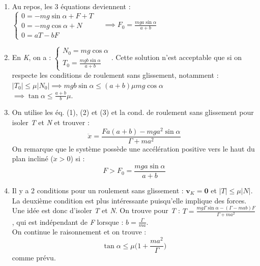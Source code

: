 \documentclass[a4paper]{article}
\begin{document}
\begin{enumerate}[(1)]

\item Au repos, les 3 équations deviennent : $\displaystyle \begin{cases}
0 = - m g \sin \alpha + F + T \\
0 = - m g \cos \alpha + N \\
0 = a T - b F
\end{cases} \quad \implies F_0 = \frac{m g a \sin \alpha}{a + b} $

\item En \emph{K}, on a : $\displaystyle \begin{cases}
N_0 = m g \cos \alpha \\
\displaystyle T_0 = \frac{m g b \sin \alpha}{a + b}
\end{cases} $. Cette solution n'est acceptable que si on respecte les conditions de roulement sans glissement, notamment : $ |T_0| \leq \mu |N_0| \implies m g b \sin \alpha \leq (a + b) \mu m g \cos \alpha $ \\
$\displaystyle \implies \tan \alpha \leq \frac{a + b}{b} \mu $.

\item On utilise les éq. (1), (2) et (3) et la cond. de roulement sans glissement pour isoler \emph{T} et \emph{N} et trouver : 
\[ \ddot{x} = \frac{F a (a + b) - m g a^2 \sin \alpha}{\Gamma + m a^2} \]
On remarque que le système possède une accélération positive vers le haut du plan incliné ($ \ddot{x} > 0 $) si : 
\[ F > F_0 = \frac{m g a \sin \alpha}{a + b} \]

\item Il y a 2 conditions pour un roulement sans glissement : $ \textbf{v}_K = \textbf{0} $ et $ |T| \leq \mu |N| $. La deuxième condition est plus intéressante puisqu'elle implique des forces. Une idée est donc d'isoler \emph{T} et \emph{N}. On trouve pour \emph{T} : $\displaystyle T = \frac{m g \Gamma \sin \alpha - (\Gamma - m a b) F}{\Gamma + m a^2} $, qui est indépendant de \emph{F} lorsque : $\displaystyle b = \frac{\Gamma}{m a} $. \\
On continue le raisonnement et on trouve : 
\[ \tan \alpha \leq \mu \bigg( 1 + \frac{m a^2}{\Gamma} \bigg) \]
comme prévu.

\end{enumerate}
\end{document}
